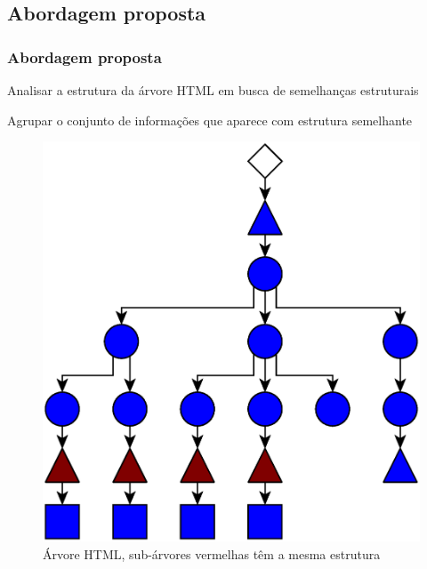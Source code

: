 \documentclass{beamer}
\newenvironment{my_itemize}{
\begin{itemize}
  \setlength{\itemsep}{5pt}
  \setlength{\parskip}{2pt}
  \setlength{\parsep}{3pt}
}{\end{itemize}}
\begin{document}
\begin{frame}[allowframebreaks]
  \subsection{Abordagem proposta}
  \frametitle{Abordagem proposta}
  \begin{my_itemize}
    \item Analisar a estrutura da árvore HTML em busca de semelhanças estruturais

    \item Agrupar o conjunto de informações que aparece com estrutura semelhante

\newpage
\begin{figure}[h]
    \includegraphics[scale=0.25]{img/tree0}
    \caption{Árvore HTML, sub-árvores vermelhas têm a mesma estrutura}
\end{figure}
\newpage
\begin{figure}[h]

\end{figure}
\end{my_itemize}
\end{frame}
\end{document}
